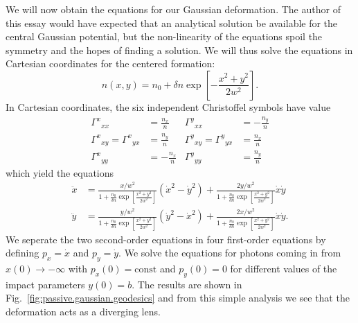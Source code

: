 We will now obtain the equations for our Gaussian deformation. The author of this essay
would have expected that an analytical solution be available for the central Gaussian
potential, but the non-linearity of the equations spoil the symmetry and the hopes 
of finding a solution. We will thus solve the equations in Cartesian coordinates
for the centered formation:
  \begin{equation}
   n(x,y) = n_0 + \delta n \exp\left[-\frac{x^2+y^2}{2w^2}\right].
  \end{equation}
In Cartesian coordinates, the six independent Christoffel symbols have
value
  \begin{align*}
   {\Gamma^x}_{xx}			&= \frac{n_x}{n}	&	{\Gamma^y}_{xx}	&=-\frac{n_y}{n}\\
   {\Gamma^x}_{xy}={\Gamma^x}_{yx} 	&= \frac{n_y}{n}	&	{\Gamma^y}_{xy}={\Gamma^y}_{yx}&=\frac{n_x}{n}\\
   {\Gamma^x}_{yy}			&= -\frac{n_x}{n}	&	{\Gamma^y}_{yy}	&=\frac{n_y}{n}
  \end{align*}
which yield the equations
  \begin{subequations}
  \begin{align}
   \ddot{x}	&= \frac{x/w^2}{1+\frac{n_0}{\delta n}\exp\left[\frac{x^2+y^2}{2w^2}\right]}\left(\dot{x}^2-\dot{y}^2\right)
	    +\frac{2y/w^2}{1+\frac{n_0}{\delta n}\exp\left[\frac{x^2+y^2}{2w^2}\right]}\dot{x}\dot{y}				\\
   \ddot{y}	&= \frac{y/w^2}{1+\frac{n_0}{\delta n}\exp\left[\frac{x^2+y^2}{2w^2}\right]}\left(\dot{y}^2-\dot{x}^2\right)
		  +\frac{2x/w^2}{1+\frac{n_0}{\delta n}\exp\left[\frac{x^2+y^2}{2w^2}\right]}\dot{x}\dot{y}.
  \end{align}
  \end{subequations}
We seperate the two second-order equations in four first-order equations by defining $p_x=\dot{x}$ and $p_y=\dot{y}$. 
We solve the equations for photons coming in from $x(0)\rightarrow-\infty$ with $p_x(0)=\text{const}$
and $p_y(0)=0$ for different values of the impact parameters $y(0)=b$. The results are shown in 
Fig.~\ref{fig:passive.gaussian.geodesics} and from this simple analysis we see that 
the deformation acts as a diverging lens. 
